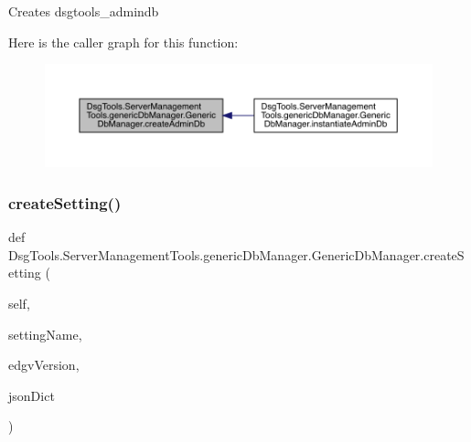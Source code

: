 \begin{DoxyVerb}Creates dsgtools_admindb
\end{DoxyVerb}
 Here is the caller graph for this function\+:
\nopagebreak
\begin{figure}[H]
\begin{center}
\leavevmode
\includegraphics[width=350pt]{class_dsg_tools_1_1_server_management_tools_1_1generic_db_manager_1_1_generic_db_manager_ab580a3306767739723fe615dba913d00_icgraph}
\end{center}
\end{figure}
\mbox{\label{class_dsg_tools_1_1_server_management_tools_1_1generic_db_manager_1_1_generic_db_manager_a254da2318a0a95fb0ddd84f6b0eb8333}} 
\subsubsection{\texorpdfstring{create\+Setting()}{createSetting()}}
{\footnotesize\ttfamily def Dsg\+Tools.\+Server\+Management\+Tools.\+generic\+Db\+Manager.\+Generic\+Db\+Manager.\+create\+Setting (\begin{DoxyParamCaption}\item[{}]{self,  }\item[{}]{setting\+Name,  }\item[{}]{edgv\+Version,  }\item[{}]{json\+Dict }\end{DoxyParamCaption})}


